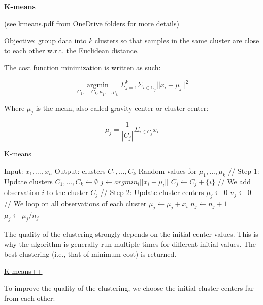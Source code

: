 {\fontsize{12pt}{22pt} \textbf{K-means}\par}

\vspace{5mm}

(see kmeans.pdf from OneDrive folders for more details)

\vspace{5mm}

Objective: group data into $k$ clusters so that samples in the same cluster are close to each other w.r.t. the Euclidean distance.

\vspace{5mm}
The cost function minimization is written as such:

$$\underset{C_1,...,C_k;\mu_1,...,\mu_k}{\operatorname{argmin}}\Sigma_{j=1}^k\Sigma_{i \in C_j}||x_i-\mu_j||^2$$

Where $\mu_j$ is the mean, also called gravity center or cluster center:

$$\mu_j=\frac{1}{|C_j|}\Sigma_{i \in C_j}x_i$$

\begin{algorithm}
\caption{K-means}
\begin{algorithmic}
\State Input: $x_1,...,x_n$
\State Output: clusters $C_1,...,C_k$
\State Random values for $\mu_1,...,\mu_k$
\State // Step 1: Update clusters
\State $C_1,...,C_k \leftarrow \emptyset$
\State $j \leftarrow argmin_l ||x_i - \mu_l||$
\State $C_j \leftarrow C_j + \{i\}$ // We add observation $i$ to the cluster $C_j$
\EndFor
\State // Step 2: Update cluster centers
\State $\mu_j \leftarrow 0$
\State $n_j \leftarrow 0$
 // We loop on all observations of each cluster
\State $\mu_j \leftarrow \mu_j + x_i$
\State $n_j \leftarrow n_j +1$
\EndFor
\State $\mu_j \leftarrow \mu_j /n_j$
\EndFor
\EndWhile
\end{algorithmic}
\end{algorithm}

The quality of the clustering strongly depends on the initial center values. This is why the algorithm is generally run multiple times for different initial values. The best clustering (i.e., that of minimum cost) is returned.

\vspace{5mm}

\underline{K-means++}

To improve the quality of the clustering, we choose the initial cluster centers far from each other:

